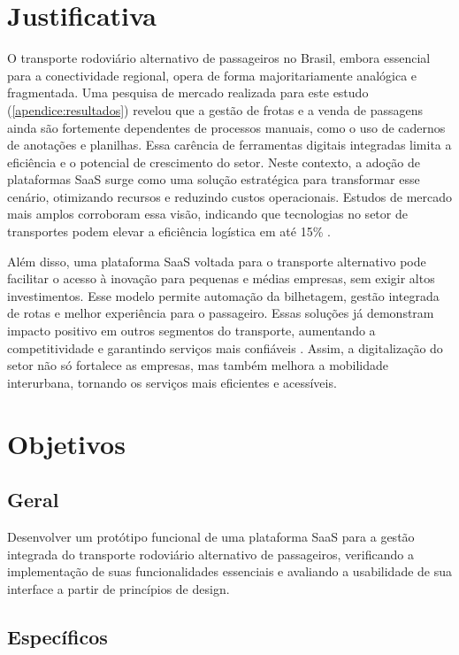 \section{Justificativa}

O transporte rodoviário alternativo de passageiros no Brasil, embora essencial para a conectividade regional, opera de forma majoritariamente analógica e fragmentada. Uma pesquisa de mercado realizada para este estudo (\autoref{apendice:resultados}) revelou que a gestão de frotas e a venda de passagens ainda são fortemente dependentes de processos manuais, como o uso de cadernos de anotações e planilhas. Essa carência de ferramentas digitais integradas limita a eficiência e o potencial de crescimento do setor. Neste contexto, a adoção de plataformas SaaS surge como uma solução estratégica para transformar esse cenário, otimizando recursos e reduzindo custos operacionais. Estudos de mercado mais amplos corroboram essa visão, indicando que tecnologias no setor de transportes podem elevar a eficiência logística em até 15\% \cite{setcepar2023}.

Além disso, uma plataforma SaaS voltada para o transporte alternativo pode facilitar o acesso à inovação para pequenas e médias empresas, sem exigir altos investimentos. Esse modelo permite automação da bilhetagem, gestão integrada de rotas e melhor experiência para o passageiro. Essas soluções já demonstram impacto positivo em outros segmentos do transporte, aumentando a competitividade e garantindo serviços mais confiáveis \cite{prologapp2024}. Assim, a digitalização do setor não só fortalece as empresas, mas também melhora a mobilidade interurbana, tornando os serviços mais eficientes e acessíveis.

\section{Objetivos}

\subsection{Geral}

Desenvolver um protótipo funcional de uma plataforma SaaS para a gestão integrada do transporte rodoviário alternativo de passageiros, verificando a implementação de suas funcionalidades essenciais e avaliando a usabilidade de sua interface a partir de princípios de design.

\subsection{Específicos}


